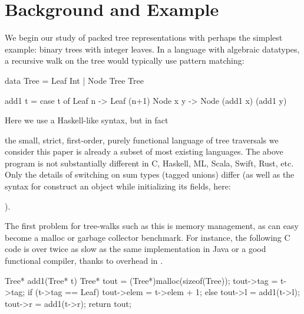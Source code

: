 \documentclass[a4paper,english]{lipics-v2016}
\newif\ifcurly
\begin{document}
\section{Background and Example}

We begin our study of packed tree representations with perhaps the
simplest example: binary trees with
integer leaves.
%
In a language with algebraic datatypes,
a recursive walk on
the tree would typically use pattern matching:

\ifcurly
\begin{code}[language=c]
type Tree = Leaf(Int) | Node(Tree,Tree);

fun add1(t) {
  match(t) {
    Leaf(n):   return Leaf(n+1);
    Node(x,y): return Node(add1(x),add1(y));
  }}
\end{code}
\else
\begin{code}
 data Tree = Leaf Int | Node Tree Tree
  
 add1 t = case t of
            Leaf n   -> Leaf (n+1)
            Node x y -> Node (add1 x) (add1 y)
\end{code}
\fi

\ifcurly
In fact,
\else
Here we use a Haskell-like syntax, but in fact
\fi
 the small, strict, first-order, purely functional language of tree traversals
we consider this paper is already a subset of most existing languages.
The above program is not substantially different in C, Haskell, ML, Scala,
Swift, Rust, etc.  Only the details of switching on sum types (tagged unions)
differ (as well as the syntax for construct an object while initializing its
fields, here: 
\ifcurly
\il{Node(e1,e2)}).
\else
{}).
\fi


The first problem for tree-walks such as this is memory management, as 
can easy become a malloc or garbage collector benchmark.  For instance, the
following C code is over twice as slow as the same implementation in Java or a
good functional compiler, thanks to overhead in .

\begin{cpp}
  Tree* add1(Tree* t) {
    Tree* tout = (Tree*)malloc(sizeof(Tree));
    tout->tag = t->tag;
    if (t->tag == Leaf) {
      tout->elem = t->elem + 1;
    } else {
      tout->l = add1(t->l);
      tout->r = add1(t->r);
    }
    return tout;
  }
\end{cpp}
\end{document}
